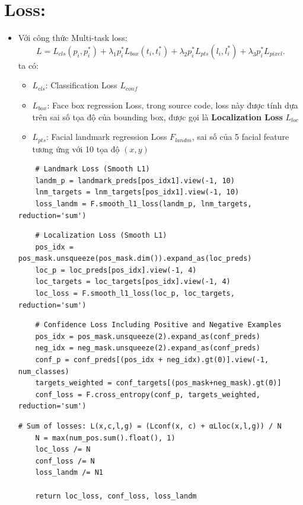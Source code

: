 \documentclass[12pt, a4paper, oneside]{book}
\theoremstyle{plain}
\numberwithin{equation}{chapter} \DeclareMathOperator{\Var}{var}
\begin{document}
\section{Loss:}
\begin{itemize}
    \item[--] Với công thức Multi-task loss:
    \begin{equation}
    L = L_{cls}(p_i,p_i^*) + \lambda_1p_i^*L_{box}(t_i,t_i^*) + \lambda_2p_i^*L_{pts}(l_i,l_i^*) + \lambda_3p_i^*L_{pixel}.
    \end{equation}
    ta có:
    \begin{itemize}
        \item[+] \(L_{cls}\): Classification Loss \(L_{conf}\)
        \item[+] \(L_{box}\): Face box regression Loss, trong source code, loss này được tính dựa trên sai số tọa độ của bounding box, được gọi là \textbf{Localization Loss} \(L_{loc}\)
        \item[+] \(L_{pts}\): Facial landmark regression Loss \(F_{landm}\), sai số của 5 facial feature tương ứng với 10 tọa độ \((x, y)\)
    \end{itemize}
    \newpage
    \begin{lstlisting}
    # Landmark Loss (Smooth L1)
    landm_p = landmark_preds[pos_idx1].view(-1, 10)
    lnm_targets = lnm_targets[pos_idx1].view(-1, 10)
    loss_landm = F.smooth_l1_loss(landm_p, lnm_targets, reduction='sum')
    \end{lstlisting}
    \begin{lstlisting}
    # Localization Loss (Smooth L1)
    pos_idx = pos_mask.unsqueeze(pos_mask.dim()).expand_as(loc_preds)
    loc_p = loc_preds[pos_idx].view(-1, 4)
    loc_targets = loc_targets[pos_idx].view(-1, 4)
    loc_loss = F.smooth_l1_loss(loc_p, loc_targets, reduction='sum')
    \end{lstlisting}
    \begin{lstlisting}
    # Confidence Loss Including Positive and Negative Examples
    pos_idx = pos_mask.unsqueeze(2).expand_as(conf_preds)
    neg_idx = neg_mask.unsqueeze(2).expand_as(conf_preds)
    conf_p = conf_preds[(pos_idx + neg_idx).gt(0)].view(-1, num_classes)
    targets_weighted = conf_targets[(pos_mask+neg_mask).gt(0)]
    conf_loss = F.cross_entropy(conf_p, targets_weighted, reduction='sum')
    \end{lstlisting}
    \begin{lstlisting}
# Sum of losses: L(x,c,l,g) = (Lconf(x, c) + αLloc(x,l,g)) / N
    N = max(num_pos.sum().float(), 1)
    loc_loss /= N
    conf_loss /= N
    loss_landm /= N1

    return loc_loss, conf_loss, loss_landm
    \end{lstlisting}
\end{itemize}
\end{document}
